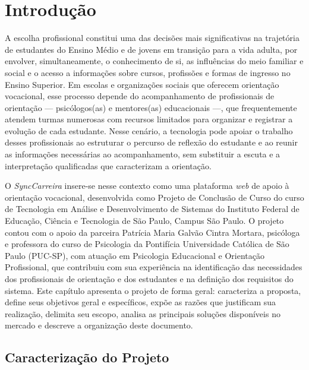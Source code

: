 \chapter{Introdução}\label{cap:introducao}

A escolha profissional constitui uma das decisões mais significativas na trajetória de estudantes do Ensino Médio e de jovens em transição para a vida adulta, por envolver, simultaneamente, o conhecimento de si, as influências do meio familiar e social e o acesso a informações sobre cursos, profissões e formas de ingresso no Ensino Superior. Em escolas e organizações sociais que oferecem orientação vocacional, esse processo depende do acompanhamento de profissionais de orientação --- psicólogos(as) e mentores(as) educacionais ---, que frequentemente atendem turmas numerosas com recursos limitados para organizar e registrar a evolução de cada estudante. Nesse cenário, a tecnologia pode apoiar o trabalho desses profissionais ao estruturar o percurso de reflexão do estudante e ao reunir as informações necessárias ao acompanhamento, sem substituir a escuta e a interpretação qualificadas que caracterizam a orientação.

O \textit{SyncCarreira} insere-se nesse contexto como uma plataforma \textit{web} de apoio à orientação vocacional, desenvolvida como Projeto de Conclusão de Curso do curso de Tecnologia em Análise e Desenvolvimento de Sistemas do Instituto Federal de Educação, Ciência e Tecnologia de São Paulo, Campus São Paulo. O projeto contou com o apoio da parceira Patrícia Maria Galvão Cintra Mortara, psicóloga e professora do curso de Psicologia da Pontifícia Universidade Católica de São Paulo (PUC-SP), com atuação em Psicologia Educacional e Orientação Profissional, que contribuiu com sua experiência na identificação das necessidades dos profissionais de orientação e dos estudantes e na definição dos requisitos do sistema. Este capítulo apresenta o projeto de forma geral: caracteriza a proposta, define seus objetivos geral e específicos, expõe as razões que justificam sua realização, delimita seu escopo, analisa as principais soluções disponíveis no mercado e descreve a organização deste documento.

\section{Caracterização do Projeto}\label{sec:caracterizacao}

